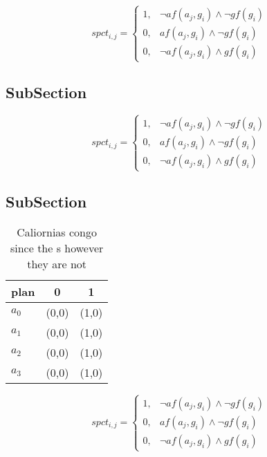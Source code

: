 \documentclass[a4paper]{article}
\begin{document}
\begin{equation}
spct_{i,j} =
\begin{cases}
1, & \text{$\neg af(a_j,g_i) \wedge \neg gf(g_i)$}\\
0, & \text{$af(a_j,g_i) \wedge \neg gf(g_i)$}\\
0, & \text{$\neg af(a_j,g_i) \wedge gf(g_i)$}
\end{cases}
\end{equation}

\subsection{SubSection}

\begin{equation}
spct_{i,j} =
\begin{cases}
1, & \text{$\neg af(a_j,g_i) \wedge \neg gf(g_i)$}\\
0, & \text{$af(a_j,g_i) \wedge \neg gf(g_i)$}\\
0, & \text{$\neg af(a_j,g_i) \wedge gf(g_i)$}
\end{cases}
\end{equation}

\subsection{SubSection}

\begin{table}
\begin{adjustbox}{width=0.7\columnwidth}
\begin{tabular}{|l|l|l|}
\hline
\textbf{plan} & \multicolumn{1}{c|}{\textbf{0}} & \multicolumn{1}{c|}{\textbf{1}} \\ \hline
\textbf{$a_0$}  & (0,0) & (1,0) \\ \hline
\textbf{$a_1$}  & (0,0) & (1,0) \\ \hline
\textbf{$a_2$}  & (0,0) & (1,0) \\ \hline
\textbf{$a_3$}  & (0,0) & (1,0) \\ \hline
\end{tabular}
\end{adjustbox}
\caption{Caliornias congo since the s however they are not
}
\end{table}

\begin{equation}
spct_{i,j} =
\begin{cases}
1, & \text{$\neg af(a_j,g_i) \wedge \neg gf(g_i)$}\\
0, & \text{$af(a_j,g_i) \wedge \neg gf(g_i)$}\\
0, & \text{$\neg af(a_j,g_i) \wedge gf(g_i)$}
\end{cases}
\end{equation}
\end{document}
